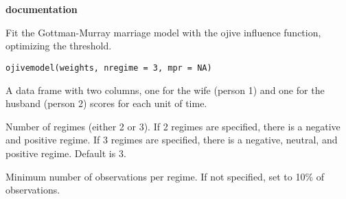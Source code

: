 \documentclass[a4paper]{book}
\begin{document}
\chapter*{}
\begin{center}
{\textbf{\huge \R{} documentation}} \par{}
\par\bigskip{\large \today}
\end{center}

\begin{Description}\relax
Fit the Gottman-Murray marriage model with the ojive influence
function, optimizing the threshold.
\end{Description}
\begin{Usage}
\begin{verbatim}
ojivemodel(weights, nregime = 3, mpr = NA)
\end{verbatim}
\end{Usage}
\begin{Arguments}
\begin{ldescription}
\item[\code{weights}] A data frame with two columns, one for the wife (person
1) and one for the husband (person 2) scores for each unit of time.
\item[\code{nregime}] Number of regimes (either 2 or 3). If 2 regimes are
specified, there is a negative and positive regime. If 3 regimes are
specified, there is a negative, neutral, and positive
regime. Default is 3.
\item[\code{mpr}] Minimum number of observations per regime. If not specified, set to 10\% of observations. 
\end{ldescription}
\end{Arguments}
\end{document}
